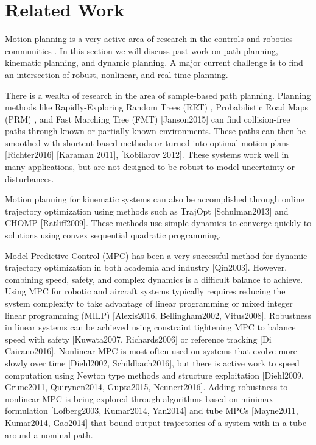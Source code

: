 \section{Related Work \label{sec:relatedwork}}
Motion planning is a very active area of research in the controls and robotics communities \cite{Hoy2015}.  In this section we will discuss past work on path planning, kinematic planning, and dynamic planning.  A major current challenge is to find an intersection of robust, nonlinear, and real-time planning. 

There is a wealth of research in the area of sample-based path planning.  Planning methods like Rapidly-Exploring Random Trees (RRT) \cite{Kuffner2000}, Probabilistic Road Maps (PRM) \cite{Kavraki1996}, and Fast Marching Tree (FMT) [Janson2015] can find collision-free paths through known or partially known environments.  These paths can then be smoothed with shortcut-based methods or turned into optimal motion plans [Richter2016] [Karaman 2011], [Kobilarov 2012].  These systems work well in many applications, but are not designed to be robust to model uncertainty or disturbances.

Motion planning for kinematic systems can also be accomplished through online trajectory optimization using methods such as TrajOpt [Schulman2013] and CHOMP [Ratliff2009].  These methods use simple dynamics to converge quickly to solutions using convex sequential quadratic programming. 

Model Predictive Control (MPC) has been a very successful method for dynamic trajectory optimization in both academia and industry [Qin2003].  However, combining speed, safety, and complex dynamics is a difficult balance to achieve. 
Using MPC for robotic and aircraft systems typically requires reducing the system complexity to take advantage of linear programming or mixed integer linear programming (MILP) [Alexis2016, Bellingham2002, Vitus2008]. Robustness in linear systems can be achieved using constraint tightening MPC to balance speed with safety [Kuwata2007, Richards2006] or reference tracking [Di Cairano2016]. Nonlinear MPC is most often used on systems that evolve more slowly over time [Diehl2002, Schildbach2016], but there is active work to speed computation using Newton type methods and structure exploitation [Diehl2009, Grune2011, Quirynen2014, Gupta2015, Neunert2016]. Adding robustness to nonlinear MPC is being explored through algorithms based on minimax formulation [Lofberg2003, Kumar2014, Yan2014] and tube MPCs [Mayne2011, Kumar2014, Gao2014] that bound output trajectories of a system with in a tube around a nominal path.

